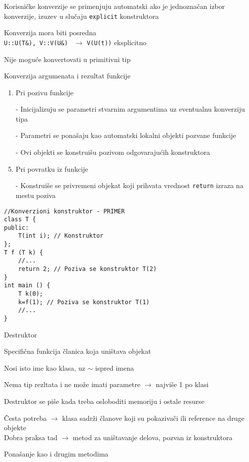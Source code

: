 \documentclass{article}
\newenvironment{xitemize}{%
    
    \itemize
    \larger
}{%
    \enditemize
}
\let\olditemize\itemize
\let\endolditemize\enditemize
\renewenvironment{itemize}{%
    \smaller
    \olditemize
}{%
    \endolditemize
}
\providecommand{\inlinecode}[1]{\texttt{#1}}
\begin{document}
\begin{xitemize}
\begin{itemize}
    \item Korisničke konverzije se primenjuju automatski ako je jednoznačan izbor konverzije, izuzev u slučaju \inlinecode{explicit} konstruktora
    \item Konverzija mora biti posredna\\
    \inlinecode{U::U(T\&), V::V(U\&) } $\rightarrow$ \inlinecode{V(U(t))} eksplicitno
    \item Nije moguće konvertovati u primitivni tip
    \item Konverzija argumenata i rezultat funkcije
    \begin{enumerate}
        \item Pri pozivu funkcije
        \begin{itemize}
            \item[-] Inicijalizuju se parametri stvarnim argumentima uz eventualnu konverziju tipa
            \item[-] Parametri se ponašaju kao automatski lokalni objekti pozvane funkcije
            \item[-] Ovi objekti se konstruišu pozivom odgovarajućih konstruktora
        \end{itemize}
        \item Pri povratku iz funkcije
        \begin{itemize}
            \item[-] Konstruiše se privremeni objekat koji prihvata vrednost \inlinecode{return} izraza na mestu poziva
        \end{itemize}
    \end{enumerate}
    \newpage
    \begin{lstlisting}
//Konverzioni konstruktor - PRIMER
class T {
public:
    T(int i); // Konstruktor
};
T f (T k) {
    //...
    return 2; // Poziva se konstruktor T(2)
}
int main () {
    T k(0);
    k=f(1); // Poziva se konstruktor T(1)
    //...
}
    \end{lstlisting}
\end{itemize}
\item Destruktor
\begin{itemize}
    \item Specifična funkcija članica koja uništava objekat
    \item Nosi isto ime kao klasa, uz $\sim$ ispred imena
    \item Nema tip rezltata i ne može imati parametre $\rightarrow$ najviše 1 po klasi
    \item Destruktor se piše kada treba osloboditi memoriju i ostale resurse
    \item Česta potreba $\rightarrow$ klasa sadrži članove koji su pokazivači ili reference na druge objekte\\
    Dobra praksa tad $\rightarrow$ metod za uništavanje delova, pozvan iz konstruktora
    \item Ponašanje kao i drugim metodima
\end{itemize}



\end{xitemize}
\end{document}
